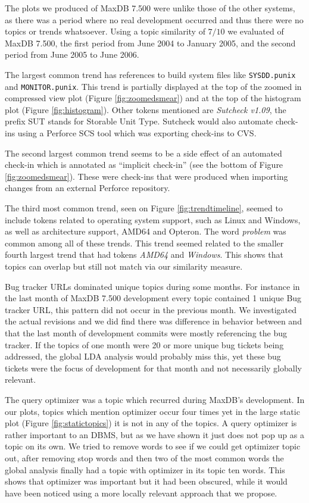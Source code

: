 \documentclass[times, 10pt,twocolumn]{article}
\begin{document}
The plots we produced of MaxDB 7.500 were unlike those of the other
systems, as there was a period where no real development occurred and
thus there were no topics or trends whatsoever. Using a topic
similarity of $7/10$ we evaluated of MaxDB 7.500, the first period
from June 2004 to January 2005, and the second period from June 2005
to June 2006.

The largest common trend has references to build system files like
\texttt{SYSDD.punix} and \texttt{MONITOR.punix}.  This trend is
partially displayed at the top of the zoomed in compressed view plot
(Figure \ref{fig:zoomedsmear}) and at the top of the histogram plot
(Figure \ref{fig:histogram}).  Other tokens mentioned are
\emph{Sutcheck v1.09}, the prefix SUT stands for Storable Unit
Type. Sutcheck would also automate check-ins using a Perforce SCS tool
which was exporting check-ins to CVS.

The second largest common trend seems to be a side effect of an
automated check-in which is annotated as ``implicit check-in'' (see
the bottom of Figure \ref{fig:zoomedsmear}). These were check-ins that
were produced when importing changes from an external Perforce
repository.

The third most common trend, seen on Figure \ref{fig:trendtimeline},
seemed to include tokens related to operating system support, such as
Linux and Windows, as well as architecture support, AMD64 and
Opteron. The word \emph{problem} was common among all of these
trends. This trend seemed related to the smaller fourth largest trend
that had tokens \emph{AMD64} and \emph{Windows}. This shows that
topics can overlap but still not match via our similarity measure.


Bug tracker URLs dominated unique topics during some months. For
instance in the last month of MaxDB 7.500 development every topic
contained 1 unique Bug tracker URL, this pattern did not occur in the
previous month. We investigated the actual revisions and we did find
there was difference in behavior between and that the last month of
development commits were mostly referencing the bug tracker. If the
topics of one month were 20 or more unique bug tickets being
addressed, the global LDA analysis would probably miss this, yet these
bug tickets were the focus of development for that month and not
necessarily globally relevant.

The query optimizer was a topic which recurred during
MaxDB's development. In our plots, topics which mention optimizer
occur four times yet in the large static plot (Figure
\ref{fig:statictopics}) it is not in any of the topics. A query
optimizer is rather important to an DBMS, but as we have shown it just
does not pop up as a topic on its own. We tried to remove words to see
if we could get optimizer topic out, after removing stop words and
then two of the most common words the global analysis finally had a
topic with optimizer in its topic ten words. This shows that optimizer
was important but it had been obscured, while it would have been
noticed using a more locally relevant approach that we propose.
\end{document}
